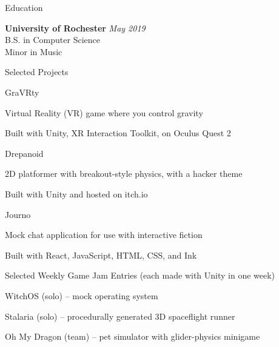 \documentclass{resume} %
\begin{document}

\begin{rSection}{Education}

\textbf{University of Rochester} \hfill \textit{May 2019} \\ 
B.S. in Computer Science \\
Minor in Music

\end{rSection}


\begin{rSection}{Selected Projects}

\begin{rProject}{GraVRty}
\item Virtual Reality (VR) game where you control gravity
\item Built with Unity, XR Interaction Toolkit, on Oculus Quest 2
\end{rProject}

\begin{rProject}{Drepanoid}
\item 2D platformer with breakout-style physics, with a hacker theme
\item Built with Unity and hosted on itch.io
\end{rProject}

\begin{rProject}{Journo}
\item Mock chat application for use with interactive fiction
\item Built with React, JavaScript, HTML, CSS, and Ink
\end{rProject}

\begin{rProject}{Selected Weekly Game Jam Entries (each made with Unity in one week)}
\item WitchOS (solo) – mock operating system
\item Stalaria (solo) – procedurally generated 3D spaceflight runner
\item Oh My Dragon (team) – pet simulator with glider-physics minigame
\end{rProject}
\end{rSection}
\end{document}
